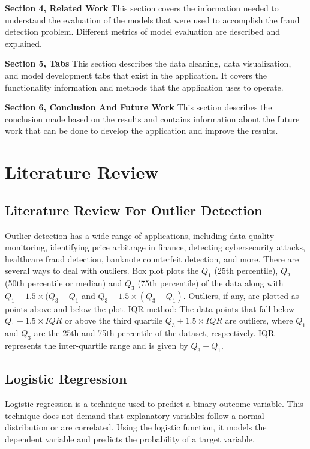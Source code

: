 \documentclass[a4paper,twocolumn,12pt]{article}
\begin{document}
\textbf{Section 4, Related Work} This section covers the information needed to understand the evaluation of the models that were used to accomplish the fraud detection problem. Different metrics of model evaluation are described and explained. 

\textbf{Section 5, Tabs} This section describes the data cleaning, data visualization, and model development tabs that exist in the application. It covers the functionality information and methods that the application uses to operate.

\textbf{Section 6, Conclusion And Future Work} This section describes the conclusion made based on the results and contains information about the future work that can be done to develop the application and improve the results. 


\section{Literature Review}

\subsection{Literature Review For Outlier Detection}

Outlier detection has a wide range of applications, including data quality monitoring, identifying price arbitrage in finance, detecting cybersecurity attacks, healthcare fraud detection, banknote counterfeit detection, and more.\cite{outlier-detection} There are several ways to deal with outliers. Box plot plots the \(Q_1\) (25th percentile), \(Q_2\) (50th percentile or median) and \(Q_3\) (75th percentile) of the data along with \(Q_1-1.5 \times (Q_3-Q_1\) and \(Q_3+1.5 \times (Q_3-Q_1)\). Outliers, if any, are plotted as points above and below the plot.\cite{boxplot-outlier} IQR method: The data points that fall below \(Q_1-1.5 \times IQR\) or above the third quartile \(Q_3 + 1.5 \times IQR\) are outliers, where \(Q_1\) and \(Q_3\) are the 25th and 75th percentile of the dataset, respectively. IQR represents the inter-quartile range and is given by \(Q_3 - Q_1\).\cite{the-data-points}

\subsection{Logistic Regression}

 Logistic regression is a technique used to predict a binary outcome variable. This technique does not demand that explanatory variables follow a normal distribution or are correlated. Using the logistic function, it models the dependent variable and predicts the probability of a target variable.\cite{chang2007intrusion}
\end{document}

